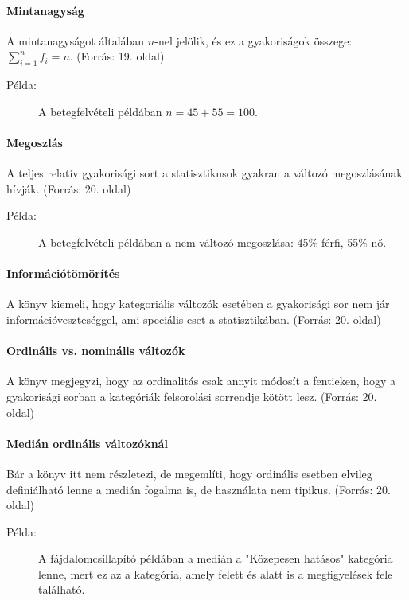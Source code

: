 \documentclass[a4paper,12pt]{article}
\begin{document}
\paragraph{Mintanagyság}
A mintanagyságot általában $n$-nel jelölik, és ez a gyakoriságok összege: $\sum_{i=1}^n f_i = n$.
(Forrás: 19. oldal)

\begin{description}
\item[Példa:] A betegfelvételi példában $n = 45 + 55 = 100$.
\end{description}

\paragraph{Megoszlás}
A teljes relatív gyakorisági sort a statisztikusok gyakran a változó megoszlásának hívják.
(Forrás: 20. oldal)

\begin{description}
\item[Példa:] A betegfelvételi példában a nem változó megoszlása: 45\% férfi, 55\% nő.
\end{description}

\paragraph{Információtömörítés}
A könyv kiemeli, hogy kategoriális változók esetében a gyakorisági sor nem jár információveszteséggel, ami speciális eset a statisztikában.
(Forrás: 20. oldal)

\paragraph{Ordinális vs. nominális változók}
A könyv megjegyzi, hogy az ordinalitás csak annyit módosít a fentieken, hogy a gyakorisági sorban a kategóriák felsorolási sorrendje kötött lesz.
(Forrás: 20. oldal)

\paragraph{Medián ordinális változóknál}
Bár a könyv itt nem részletezi, de megemlíti, hogy ordinális esetben elvileg definiálható lenne a medián fogalma is, de használata nem tipikus.
(Forrás: 20. oldal)

\begin{description}
\item[Példa:] A fájdalomcsillapító példában a medián a "Közepesen hatásos" kategória lenne, mert ez az a kategória, amely felett és alatt is a megfigyelések fele található.
\end{description}
\end{document}
